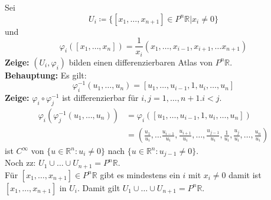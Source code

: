 \begin{problem*}[3a]
Sei 
\begin{equation*}  
  U_i \coloneqq \{ [x_1, \dots , x_{ n+1 }] \in P^n\mathbb{R} | x_i \neq 0 \}
\end{equation*}
und 
\begin{equation*}
  \varphi_i ([x_1, \dots , x_{ n }] ) = \frac{1}{x_i}(x_1, \dots , x_{ i-1 },x_{ i+1 }, \dots x_{ n+1 })
\end{equation*}
\textbf{Zeige:} $(U_i, \varphi_i)$ bilden einen differenzierbaren Atlas von $P^n\mathbb{R}$.\\
\textbf{Behauptung:} Es gilt:
\begin{equation*}
  \varphi_i^{ -1 } (u_1, \dots , u_{ n } ) = [u_1, \dots , u_{ i-1 }, 1, u_i, \dots , u_n]
\end{equation*}
\textbf{Zeige:} $\varphi_i \circ \varphi^{ -1 }_j$ ist differenzierbar für $i,j = 1, \dots, n+1. i < j$.
\begin{align*}
  \varphi_i (\varphi_j^{ -1 } (u_1, \dots , u_{ n })) &= \varphi_i([u_1, \dots , u_{ i-1 }, 1, u_i, \dots , u_n]) \\
  &= \left( 
  \frac{u_1}{u_i}, \dots \frac{u_{ i-1 }}{u_i}, \frac{u_{ i+1 }}{u_i}, \dots , \frac{u_{ j-1 }}{u_i}, \frac{1}{u_i}, \frac{u_{ j }}{u_i}, \dots , \frac{u_n}{u_i} 
  \right)
\end{align*}
ist $C^{ \infty }$ von $\{ u \in \mathbb{R}^n : u_i \neq 0 \}$ nach $\{ u \in \mathbb{R}^n : u_{ j-1 }\neq 0 \}$. \\
Noch zz: $U_1 \cup \dots \cup U_{ n+1 } = P^n\mathbb{R} $.\\
Für $[x_1, \dots , x_{ n+1 }] \in P^n\mathbb{R} $ gibt es mindestens ein $ i $ mit $ x_i \neq 0 $ damit ist $[x_1, \dots , x_{ n+1 }]$ in $U_i$. Damit gilt $U_1 \cup \dots \cup U_{ n+1 } = P^n\mathbb{R} $. 
\end{problem*}

